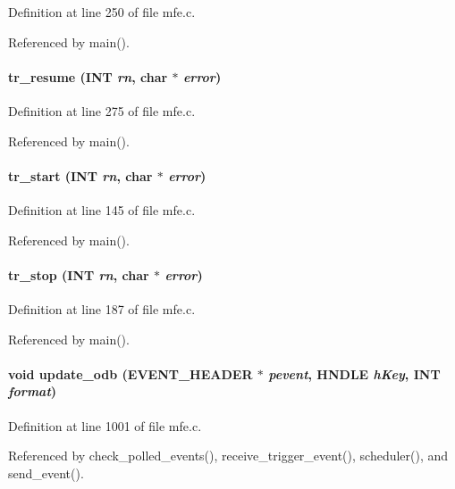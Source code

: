 Definition at line 250 of file mfe.c.

Referenced by main().
\paragraph[{tr\_\-resume}]{ tr\_\-resume ({\bf INT} {\em rn}, \/  char $\ast$ {\em error})}\hfill\label{mfe_8c_ac69f1c3106f3389ed0dde43e7b86e54d}


Definition at line 275 of file mfe.c.

Referenced by main().
\paragraph[{tr\_\-start}]{ tr\_\-start ({\bf INT} {\em rn}, \/  char $\ast$ {\em error})}\hfill\label{mfe_8c_a5ed14877e514f13eeb65a16898b2ba32}


Definition at line 145 of file mfe.c.

Referenced by main().
\paragraph[{tr\_\-stop}]{ tr\_\-stop ({\bf INT} {\em rn}, \/  char $\ast$ {\em error})}\hfill\label{mfe_8c_a5c030a1926f2439e78b7bd0d00221937}


Definition at line 187 of file mfe.c.

Referenced by main().
\paragraph[{update\_\-odb}]{\setlength{\rightskip}{0pt plus 5cm}void update\_\-odb ({\bf EVENT\_\-HEADER} $\ast$ {\em pevent}, \/  HNDLE {\em hKey}, \/  {\bf INT} {\em format})}\hfill\label{mfe_8c_acca4a95b509b37c83c2e76cb88de232a}


Definition at line 1001 of file mfe.c.

Referenced by check\_\-polled\_\-events(), receive\_\-trigger\_\-event(), scheduler(), and send\_\-event().

